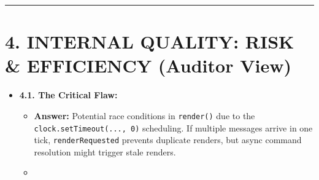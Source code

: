 \begin{center}\rule{0.5\linewidth}{0.5pt}\end{center}

\section{4. INTERNAL QUALITY: RISK \& EFFICIENCY (Auditor View)}\label{record-413-internal-quality-risk-efficiency-auditor-view}

\begin{itemize}
\tightlist
\item
  \textbf{4.1. The Critical Flaw:}

  \begin{itemize}
  \tightlist
  \item
    \textbf{Answer:} Potential race conditions in \texttt{r\allowbreak{}e\allowbreak{}n\allowbreak{}d\allowbreak{}e\allowbreak{}r\allowbreak{}(\allowbreak{})} due to the \texttt{c\allowbreak{}l\allowbreak{}o\allowbreak{}c\allowbreak{}k\allowbreak{}.\allowbreak{}s\allowbreak{}e\allowbreak{}t\allowbreak{}T\allowbreak{}i\allowbreak{}m\allowbreak{}e\allowbreak{}o\allowbreak{}u\allowbreak{}t\allowbreak{}(\allowbreak{}.\allowbreak{}.\allowbreak{}.\allowbreak{},\allowbreak{} \allowbreak{}0\allowbreak{})} scheduling. If multiple messages arrive in one tick, \texttt{r\allowbreak{}e\allowbreak{}n\allowbreak{}d\allowbreak{}e\allowbreak{}r\allowbreak{}R\allowbreak{}e\allowbreak{}q\allowbreak{}u\allowbreak{}e\allowbreak{}s\allowbreak{}t\allowbreak{}e\allowbreak{}d} prevents duplicate renders, but async command resolution might trigger stale renders.
  \item

\end{itemize}
\end{itemize}
